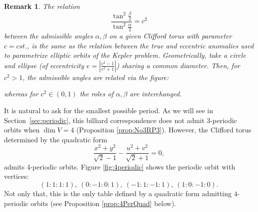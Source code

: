 \documentclass{article}
\newtheorem{rmk}{Remark}
\begin{document}
\begin{rmk}
    The relation 
    \begin{equation}
    \label{eq:KeplerProblem}
        \dfrac{\tan^2 \frac{\beta}{2}}{\tan^2 \frac{\alpha}{2}} = c^2
    \end{equation} 
    between the admissible angles $\alpha,\beta$ on a given Clifford torus with parameter 
    $c = cst.$, is the same as the relation between the true and eccentric anomalies used 
    to parametrize elliptic orbits of the Kepler problem. Geometrically, take a circle and 
    ellipse (of eccentricity $e = \left|\frac{c^2-1}{c^2+1}\right|$) sharing a common 
    diameter. Then, for $c^2>1$, the admissible angles are related via the figure:
    \begin{center}
    \end{center}
whereas for $c^2\in (0,1)$ the roles of $\alpha,\beta$ are interchanged. %
\end{rmk}

It is natural to ask for the smallest possible period. As we will see in 
Section~\ref{sec:periodic}, this billiard correspondence does not admit 3-periodic orbits 
when $\dim V=4$ (Proposition \ref{prop:No3RP3}). However, the Clifford torus determined by 
the quadratic form
\[ \frac{x^2+y^2}{\sqrt{2}-1} - \frac{u^2+v^2}{\sqrt{2}+1} = 0,\]
admits 4-periodic orbits. Figure \ref{fig:4periodic} shows the periodic orbit with 
vertices:
\[ (1:1:1:1), ~ (0:-1:0:1), ~(-1:1:-1:1), ~ (1:0:-1:0).  \]
Not only that, this is the only table defined by a quadratic form admitting $4$-periodic 
orbits (see Proposition \ref{prop:4PerQuad} below).
\end{document}
